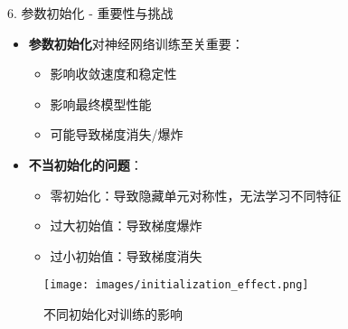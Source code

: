 \documentclass[
  ignorenonframetext,
  aspectratio=169,
  chinese-hans,
]{beamer}
\providecommand{\tightlist}{%
  \setlength{\itemsep}{0pt}\setlength{\parskip}{0pt}}\usepackage{longtable,booktabs,array}
\begin{document}
\begin{frame}{6. 参数初始化 - 重要性与挑战}
\label{ux53c2ux6570ux521dux59cbux5316---ux91cdux8981ux6027ux4e0eux6311ux6218}
\begin{itemize}
\tightlist
\item
  \textbf{参数初始化}对神经网络训练至关重要：

  \begin{itemize}
  \tightlist
  \item
    影响收敛速度和稳定性
  \item
    影响最终模型性能
  \item
    可能导致梯度消失/爆炸
  \end{itemize}
\item
  \textbf{不当初始化的问题}：

  \begin{itemize}
  \tightlist
  \item
    零初始化：导致隐藏单元对称性，无法学习不同特征
  \item
    过大初始值：导致梯度爆炸
  \item
    过小初始值：导致梯度消失
  \end{itemize}
\end{itemize}

\begin{figure}[H]

{\centering \texttt{[image: images/initialization\_effect.png]}

}

\caption{不同初始化对训练的影响}

\end{figure}%
\end{frame}
\end{document}
